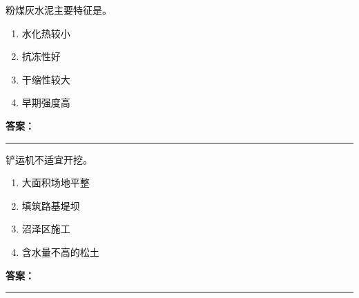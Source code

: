 \documentclass[UTF8,fontset=fandol,11pt]{ctexart}
\newcommand{\answerline}{\textcolor{answerred}{\rule{2.4cm}{0.7pt}}}
\begin{document}
\begin{quizbox}[title={乱序第 227 题｜第四章混凝土结构工程}]

粉煤灰水泥主要特征是。\\

\begin{enumerate}[label=\Alph*.]

\item 水化热较小

\item 抗冻性好

\item 干缩性较大

\item 早期强度高

\end{enumerate}

\textbf{\textcolor{answerred}{答案：}} \answerline

\end{quizbox}

\vspace{0.2em}

\begin{quizbox}[title={乱序第 228 题｜第一章土方工程}]

铲运机不适宜开挖。\\

\begin{enumerate}[label=\Alph*.]

\item 大面积场地平整

\item 填筑路基堤坝

\item 沼泽区施工

\item 含水量不高的松土

\end{enumerate}

\textbf{\textcolor{answerred}{答案：}} \answerline

\end{quizbox}

\vspace{0.2em}
\end{document}
